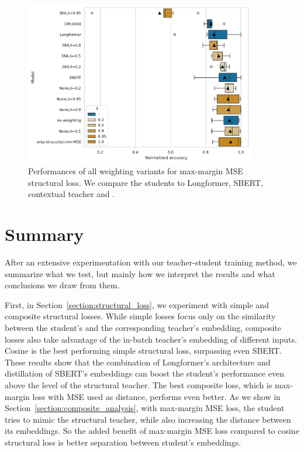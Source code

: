 \begin{figure}

  \includegraphics[width=0.9\textwidth]{img/mm_mse_weighting.pdf}

  \caption{Performances of all weighting variants for max-margin MSE
  structural loss. We compare the students to Longformer, SBERT,
   contextual teacher and .}

  \label{fig:mm_mse_weighting}

\end{figure}

\section{Summary}\label{section:experiments_summary}

After an extensive experimentation with our teacher-student training method, we
summarize what we test, but mainly how we interpret the results and what
conclusions we draw from them.

First, in Section~\ref{section:structural_loss}, we experiment with simple and
composite structural losses. While simple losses focus only on the similarity
between the student's and the corresponding teacher's embedding, composite
losses also take advantage of the in-batch teacher's embedding of different
inputs. Cosine is the best performing simple structural loss, surpassing even
SBERT. These results show that the combination of Longformer's architecture and
distillation of SBERT's embeddings can boost the student's performance even
above the level of the structural teacher. The best composite loss, which is
max-margin loss with MSE used as distance, performs even better. As we show in
Section~\ref{section:composite_analysis}, with max-margin MSE loss, the student
tries to mimic the structural teacher, while also increasing the distance
between its embeddings. So the added benefit of max-margin MSE loss compared to
cosine structural loss is better separation between student's embeddings.

